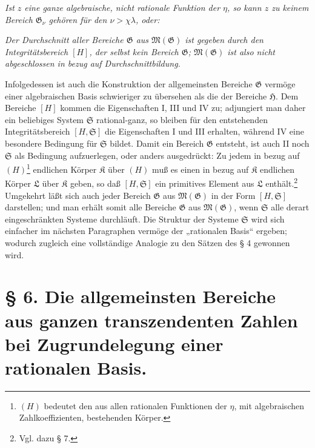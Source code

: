 \documentclass[11pt]{article}
\begin{document}
\emph{Ist $z$ eine ganze algebraische, nicht rationale Funktion der $\eta$, so
kann $z$ zu keinem Bereich $\mathfrak G_\nu$ gehören für den
$\nu>\chi\lambda$, oder:}

\emph{Der Durchschnitt aller Bereiche $\mathfrak G$ aus
$\mathfrak M(\mathfrak G)$ ist gegeben durch den Integritätsbereich $[H]$, der
selbst kein Bereich $\mathfrak G$; $\mathfrak M(\mathfrak G)$ ist also nicht
abgeschlossen in bezug auf Durchschnittbildung.}

Infolgedessen ist auch die Konstruktion der allgemeinsten Bereiche $\mathfrak G$
vermöge einer algebraischen Basis schwieriger zu übersehen als die der Bereiche
$\mathfrak H$. Dem Bereiche $[H]$ kommen die Eigenschaften I, III und IV zu;
adjungiert man daher ein beliebiges System $\mathfrak S$ rational-ganz, so
bleiben für den entstehenden Integritätsbereich $[H,\mathfrak S]$ die
Eigenschaften I und III erhalten, während IV eine besondere Bedingung für
$\mathfrak S$ bildet. Damit ein Bereich $\mathfrak G$ entsteht, ist auch II noch
$\mathfrak S$ als Bedingung aufzuerlegen, oder anders ausgedrückt: Zu jedem in
bezug auf $(H)$\footnote{$(H)$ bedeutet den aus allen rationalen Funktionen der
$\eta$, mit algebraischen Zahlkoeffizienten, bestehenden Körper.} endlichen
Körper $\mathfrak K$ über $(H)$ muß es einen in bezug auf $\mathfrak K$
endlichen Körper $\mathfrak L$ über $\mathfrak K$ geben, so daß
$[H,\mathfrak S]$ ein primitives Element aus $\mathfrak L$ enthält.\footnote{Vgl.
dazu § 7.} Umgekehrt läßt sich auch jeder Bereich $\mathfrak G$ aus
$\mathfrak M(\mathfrak G)$ in der Form $[H,\mathfrak S]$ darstellen; und man
erhält somit alle Bereiche $\mathfrak G$ aus $\mathfrak M(\mathfrak G)$, wenn
$\mathfrak S$ alle derart eingeschränkten Systeme durchläuft. Die Struktur der
Systeme $\mathfrak S$ wird sich einfacher im nächsten Paragraphen vermöge der
„rationalen Basis“ ergeben; wodurch zugleich eine vollständige Analogie zu den
Sätzen des § 4 gewonnen wird.

\section*{§ 6. Die allgemeinsten Bereiche aus ganzen transzendenten Zahlen bei Zugrundelegung einer rationalen Basis.}
\end{document}
